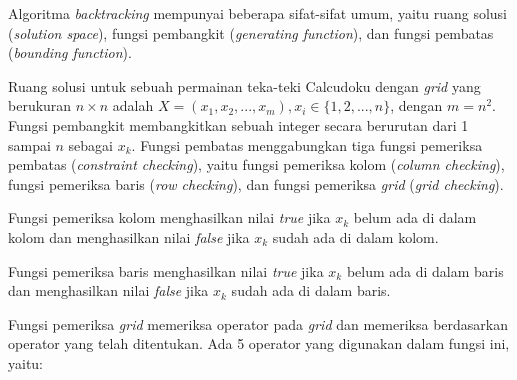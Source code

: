 Algoritma \textit{backtracking} mempunyai beberapa sifat-sifat umum, yaitu ruang solusi (\textit{solution space}), fungsi pembangkit (\textit{generating function}), dan fungsi pembatas (\textit{bounding function}).

Ruang solusi untuk sebuah permainan teka-teki Calcudoku dengan \textit{grid} yang berukuran \begin{math}n \times n\end{math} adalah \begin{math}X = (x_1,x_2,...,x_m), x_i \in \{1,2,...,n\}\end{math}, dengan \begin{math}m = n^2\end{math}. Fungsi pembangkit membangkitkan sebuah integer secara berurutan dari 1 sampai \begin{math}n\end{math} sebagai \begin{math}x_k\end{math}. Fungsi pembatas menggabungkan tiga fungsi pemeriksa pembatas (\textit{constraint checking}), yaitu fungsi pemeriksa kolom (\textit{column checking}), fungsi pemeriksa baris (\textit{row checking}), dan fungsi pemeriksa \textit{grid} (\textit{grid checking}).

Fungsi pemeriksa kolom menghasilkan nilai \textit{true} jika \begin{math}x_k\end{math} belum ada di dalam kolom dan menghasilkan nilai \textit{false} jika \begin{math}x_k\end{math} sudah ada di dalam kolom.

Fungsi pemeriksa baris menghasilkan nilai \textit{true} jika \begin{math}x_k\end{math} belum ada di dalam baris dan menghasilkan nilai \textit{false} jika \begin{math}x_k\end{math} sudah ada di dalam baris.

Fungsi pemeriksa \textit{grid} memeriksa operator pada \textit{grid} dan memeriksa berdasarkan operator yang telah ditentukan. Ada 5 operator yang digunakan dalam fungsi ini, yaitu:

